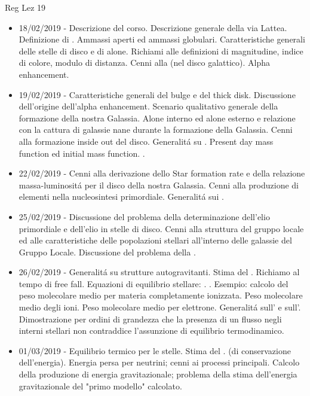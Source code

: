 \begin{frame}[allowframebreaks]{Reg Lez 19}
%
\begin{itemize}
\item 18/02/2019 - Descrizione del corso. Descrizione generale della via Lattea. Definizione di . Ammassi aperti ed ammassi globulari. Caratteristiche generali delle stelle di disco e di alone. Richiami alle definizioni di magnitudine, indice di colore, modulo di distanza. Cenni alla  (nel disco galattico). Alpha enhancement. 
\item 19/02/2019 - Caratteristiche generali del bulge e del thick disk. Discussione dell'origine dell'alpha enhancement. Scenario qualitativo generale della formazione della nostra Galassia. Alone interno ed alone esterno e relazione con la cattura di galassie nane durante la formazione della Galassia. Cenni alla formazione inside out del disco. Generalit\'a su . Present day mass function ed initial mass function. . 
\item 22/02/2019 - Cenni alla derivazione dello Star formation rate e della relazione massa-luminosit\'a per il disco della nostra Galassia. Cenni alla produzione di elementi nella nucleosintesi primordiale. Generalit\'a sui . 
\item 25/02/2019 - Discussione del problema della determinazione dell'elio primordiale e dell'elio in stelle di disco. Cenni alla struttura del gruppo locale ed alle caratteristiche delle popolazioni stellari all'interno delle galassie del Gruppo Locale. Discussione del problema della . 
\item 26/02/2019 - Generalit\'a su strutture autogravitanti. Stima del . Richiamo al tempo di free fall. Equazioni di equilibrio stellare: . . Esempio: calcolo del peso molecolare medio per materia completamente ionizzata. Peso molecolare medio degli ioni. Peso molecolare medio per elettrone. Generalit\'a sull' e sull'. Dimostrazione per ordini di grandezza che la presenza di un flusso negli interni stellari non contraddice l'assunzione di equilibrio termodinamico. 
\item 01/03/2019 - Equilibrio termico per le stelle. Stima del .  (di conservazione dell'energia). Energia persa per neutrini; cenni ai processi principali. Calcolo della produzione di energia gravitazionale; problema della stima dell'energia gravitazionale del "primo modello" calcolato.


\end{itemize}
\end{frame}
